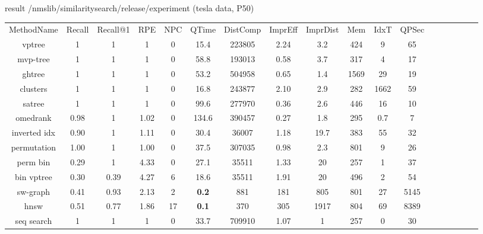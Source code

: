 \documentclass[xcolor=dvipsnames, aspectratio=1610]{beamer}
\newcommand{\alertA}[1]{\color{alertAcolor}#1\color{Black}}
\begin{document}
\begin{frame}[fragile]{result /nmslib/similarity\textunderscore search/release/experiment (tesla data, P50)} 
\linespread{1}\tiny{
\begin{minipage}{0.99\textwidth}  
{\fontsize{7}{2} \selectfont
\begin{tabular}{cccccccccccccccccc}
MethodName   & Recall & Recall@1 & RPE         & NPC & QTime & DistComp & ImprEff & ImprDist & Mem & IdxT & QPSec \\
vptree       & 1      & 1        & 1           & 0   & 15.4  & 223805   & 2.24    & 3.2      & 424 & 9     &  65  \\
mvp-tree     & 1      & 1        & 1           & 0   & 58.8  & 193013   & 0.58    & 3.7      & 317 & 4     &  17  \\
ghtree       & 1      & 1        & 1           & 0   & 53.2  & 504958   & 0.65    & 1.4     & 1569 & 29    &  19  \\
 clusters    & 1      & 1        & 1           & 0   & 16.8  & 243877   & 2.10    & 2.9      & 282 & 1662  &  59  \\
satree       & 1      & 1        & 1           & 0   & 99.6  & 277970   & 0.36    & 2.6      & 446 & 16    &  10  \\
omedrank     & 0.98   & 1        & 1.02        & 0   & 134.6 & 390457   & 0.27    & 1.8      & 295 & 0.7   &  7  \\
inverted idx & 0.90   & 1        & 1.11        & 0   & 30.4  & 36007    & 1.18    & 19.7     & 383 & 55    &  32 \\
permutation  & 1.00   & 1        & 1.00        & 0   & 37.5  & 307035   & 0.98    & 2.3      & 801 & 9     &  26 \\
perm bin     & 0.29   & 1        & 4.33        & 0   & 27.1  & 35511    & 1.33    & 20       & 257 & 1     &  37  \\
bin vptree   & 0.30   & 0.39     & 4.27        & 6   & 18.6  & 35511    & 1.91    & 20       & 496 & 2     &  54  \\
sw-graph     & 0.41   & 0.93     & 2.13        & 2   & \alertA{\bf{0.2}}   & 881      & 181     & 805      & 801 & 27    &  5145 \\
hnsw         & 0.51   & 0.77     & 1.86        & 17  & \alertA{\bf{0.1}}   & 370      & 305     & 1917     & 804 & 69    &  8389  \\
seq search   & 1      & 1        & 1           & 0   & 33.7  & 709910   & 1.07    & 1        & 257 & 0     &  30  \\
\end{tabular}
}
\end{minipage}}
\end{frame}
\end{document}
